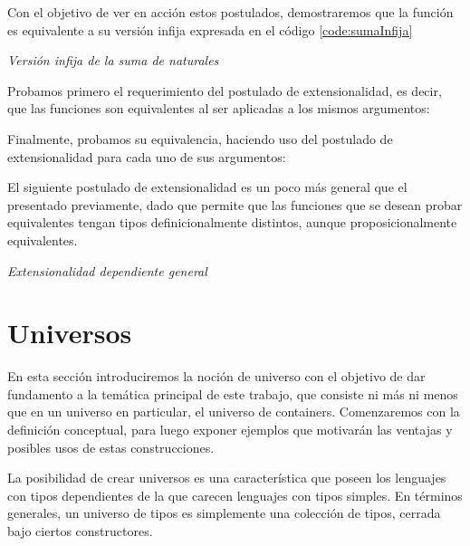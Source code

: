 Con el objetivo de ver en acción estos postulados, demostraremos que la función  es equivalente a su versión infija expresada en el código \ref{code:sumaInfija}
\begin{agdacode}\label{code:sumaInfija}{\it Versión infija de la suma de naturales}

\end{agdacode}

Probamos primero el requerimiento del postulado de extensionalidad, es decir, que las funciones son equivalentes al ser aplicadas a los mismos argumentos:


Finalmente, probamos su equivalencia, haciendo uso del postulado de extensionalidad para cada uno de sus argumentos:


El siguiente postulado de extensionalidad es un poco más general que el presentado previamente, dado que permite que las funciones que se desean probar equivalentes tengan tipos definicionalmente distintos, aunque proposicionalmente equivalentes.

\begin{agdacode}\label{code:dext}{\it Extensionalidad dependiente general }

\end{agdacode}




\section{Universos} \label{universos}


En esta sección introduciremos la noción de universo con el objetivo de dar fundamento a la temática principal de este trabajo, que consiste ni más ni menos que en un universo en particular, el universo de containers. Comenzaremos con la definición conceptual, para luego exponer ejemplos que motivarán las ventajas y posibles usos de estas construcciones.

La posibilidad de crear universos es una característica que poseen los lenguajes con tipos dependientes de la que carecen lenguajes con tipos simples.   
En términos generales, un universo de tipos es simplemente una colección de tipos, cerrada bajo ciertos constructores.

